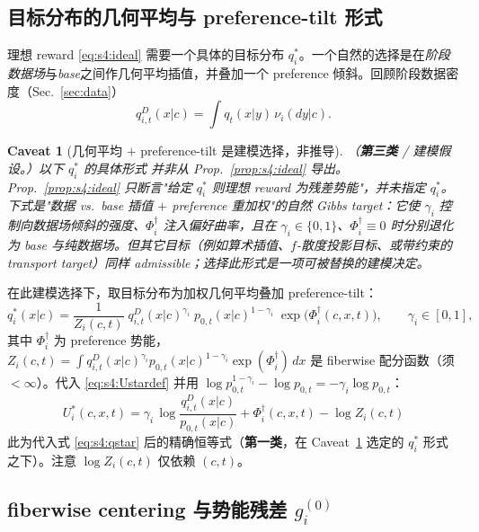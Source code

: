 \documentclass[11pt,a4paper]{article}
\newtheorem{caveat}[theorem]{Caveat}
\begin{document}
\subsection{目标分布的几何平均与 preference-tilt 形式}

理想 reward \eqref{eq:s4:ideal} 需要一个具体的目标分布 $q_i^*$。一个自然的选择是在\emph{阶段数据场}与\emph{base}之间作几何平均插值，并叠加一个 preference 倾斜。回顾阶段数据密度（Sec.~\ref{sec:data}）
\[
q_{i,t}^D(x|c)=\int q_t(x|y)\,\nu_i(dy|c).
\]

\begin{caveat}[几何平均 $+$ preference-tilt 是建模选择，非推导]\label{cav:s4:modeling}
（\textbf{第三类} / 建模假设。）以下 $q_i^*$ 的具体形式 \emph{并非}从 Prop.~\ref{prop:s4:ideal} 导出。Prop.~\ref{prop:s4:ideal} 只断言"给定 $q_i^*$ 则理想 reward 为残差势能"，并未指定 $q_i^*$。下式是"数据 vs.\ base 插值 $+$ preference 重加权"的\emph{自然} Gibbs target：它使 $\gamma_i$ 控制向数据场倾斜的强度、$\Phi_i^\dagger$ 注入偏好曲率，且在 $\gamma_i\in\{0,1\}$、$\Phi_i^\dagger\equiv0$ 时分别退化为 base 与纯数据场。但其它目标（例如算术插值、$f$-散度投影目标、或带约束的 transport target）同样 admissible；选择此形式是一项可被替换的建模决定。
\end{caveat}

在此建模选择下，取目标分布为加权几何平均叠加 preference-tilt：
\begin{equation}\label{eq:s4:qstar}
q_i^*(x|c)=\frac{1}{Z_i(c,t)}\;q_{i,t}^D(x|c)^{\gamma_i}\;p_{0,t}(x|c)^{1-\gamma_i}\;\exp\!\bigl(\Phi_i^\dagger(c,x,t)\bigr),\qquad \gamma_i\in[0,1],
\end{equation}
其中 $\Phi_i^\dagger$ 为 preference 势能，$Z_i(c,t)=\int q_{i,t}^D(x|c)^{\gamma_i}p_{0,t}(x|c)^{1-\gamma_i}\exp(\Phi_i^\dagger)\,dx$ 是 fiberwise 配分函数（须 $<\infty$）。代入 \eqref{eq:s4:Ustardef} 并用 $\log p_{0,t}^{1-\gamma_i}-\log p_{0,t}=-\gamma_i\log p_{0,t}$：
\begin{equation}\label{eq:s4:Ustar}
\boxed{\;U_i^*(c,x,t)=\gamma_i\,\log\frac{q_{i,t}^D(x|c)}{p_{0,t}(x|c)}+\Phi_i^\dagger(c,x,t)-\log Z_i(c,t)\;}
\end{equation}
此为代入式 \eqref{eq:s4:qstar} 后的精确恒等式（\textbf{第一类}，在 Caveat~\ref{cav:s4:modeling} 选定的 $q_i^*$ 形式之下）。注意 $\log Z_i(c,t)$ 仅依赖 $(c,t)$。

\subsection{fiberwise centering 与势能残差 $g_i^{(0)}$}
\label{subsec:s4:centering}
\end{document}
